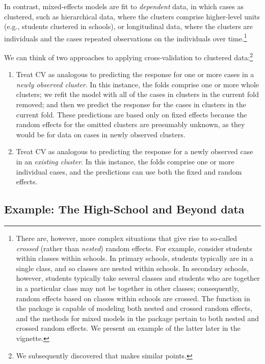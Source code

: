 \documentclass[
]{jss}
\begin{document}
In contrast, mixed-effects models are fit to \emph{dependent} data, in
which cases as clustered, such as hierarchical data, where the clusters
comprise higher-level units (e.g., students clustered in schools), or
longitudinal data, where the clusters are individuals and the cases
repeated observations on the individuals over time.\footnote{There are,
  however, more complex situations that give rise to so-called
  \emph{crossed} (rather than \emph{nested}) random effects. For
  example, consider students within classes within schools. In primary
  schools, students typically are in a single class, and so classes are
  nested within schools. In secondary schools, however, students
  typically take several classes and students who are together in a
  particular class may not be together in other classes; consequently,
  random effects based on classes within schools are crossed. The
   function in the  package is capable of
  modeling both nested and crossed random effects, and the 
  methods for mixed models in the  package pertain to both
  nested and crossed random effects. We present an example of the latter
  later in the vignette.}

We can think of two approaches to applying cross-validation to clustered
data:\footnote{We subsequently discovered that \citet[Section
  8]{Vehtari:2023} makes similar points.}

\begin{enumerate}
\def\labelenumi{\arabic{enumi}.}
\item
  Treat CV as analogous to predicting the response for one or more cases
  in a \emph{newly observed cluster}. In this instance, the folds
  comprise one or more whole clusters; we refit the model with all of
  the cases in clusters in the current fold removed; and then we predict
  the response for the cases in clusters in the current fold. These
  predictions are based only on fixed effects because the random effects
  for the omitted clusters are presumably unknown, as they would be for
  data on cases in newly observed clusters.
\item
  Treat CV as analogous to predicting the response for a newly observed
  case in an \emph{existing cluster}. In this instance, the folds
  comprise one or more individual cases, and the predictions can use
  both the fixed and random effects.
\end{enumerate}

\hypertarget{example-the-high-school-and-beyond-data}{%
\subsection{Example: The High-School and Beyond
data}\label{example-the-high-school-and-beyond-data}}
\end{document}

